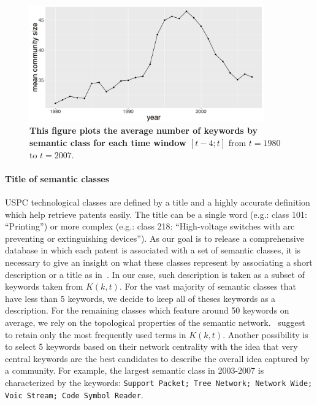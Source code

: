 \documentclass[12pt,twoside,a4paper]{article}
\begin{document}
\begin{figure}
\centering
\includegraphics[width=0.9\textwidth]{meancomsize}
\caption{\textbf{This figure plots the average number of keywords by semantic class for each time window $\left[t-4; t\right]$} from $t=1980$ to $t=2007$.}
\label{fig:mean_K}
\end{figure}



\paragraph*{Title of semantic classes}
USPC technological classes are defined by a title and a highly accurate definition which help retrieve patents easily. The title can be a single word (e.g.: class 101: ``Printing'') or more complex (e.g.: class 218: ``High-voltage switches with arc preventing or extinguishing devices''). As our goal is to release a comprehensive database in which each patent is associated with a set of semantic classes, it is necessary to give an insight on what these classes represent by associating a short description or a title as in~\cite{tseng2007text}. In our case, such description is taken as a subset of keywords taken from $K(k,t)$. For the vast majority of semantic classes that have less than 5 keywords, we decide to keep all of theses keywords as a description. For the remaining classes which feature around 50 keywords on average, we rely on the topological properties of the semantic network.~\cite{yang2000improving} suggest to retain only the most frequently used terms in $K(k,t)$. Another possibility is to select 5 keywords based on their network centrality with the idea that very central keywords are the best candidates to describe the overall idea captured by a community. For example, the largest semantic class in 2003-2007 is characterized by the keywords: \texttt{Support Packet; Tree Network; Network Wide; Voic Stream; Code Symbol Reader}.
\end{document}
